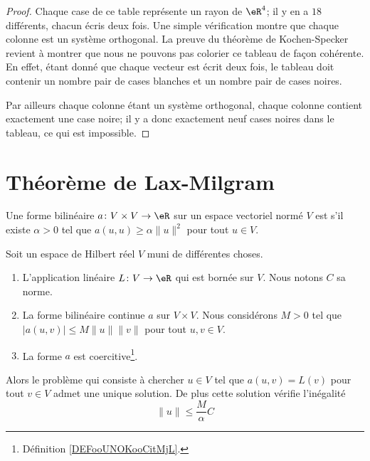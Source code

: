 \begin{proof}
    Chaque case de ce table représente un rayon de \( \eR^4\); il y en a \( 18\) différents, chacun écris deux fois. Une simple vérification montre que chaque colonne est un système orthogonal. La preuve du théorème de Kochen-Specker revient à montrer que nous ne pouvons pas colorier ce tableau de façon cohérente. En effet, étant donné que chaque vecteur est écrit deux fois, le tableau doit contenir un nombre pair de cases blanches et un nombre pair de cases noires.

    Par ailleurs chaque colonne étant un système orthogonal, chaque colonne contient exactement une case noire; il y a donc exactement neuf cases noires dans le tableau, ce qui est impossible.

\end{proof}

\section{Théorème de Lax-Milgram}

\begin{definition}      \label{DEFooUNOKooCitMjL}
    Une forme bilinéaire \( a\colon V\times V\to \eR\) sur un espace vectoriel normé \( V\) est  s'il existe \( \alpha>0\) tel que \(  a(u,u)\geq \alpha\| u \|^2 \) pour tout \( u\in V\).
\end{definition}

\begin{theorem}       \label{THOooLLUXooHyqmVL}
    Soit un espace de Hilbert réel \( V\) muni de différentes choses.
    \begin{enumerate}
        \item
            L'application linéaire \( L\colon V\to \eR\) qui est bornée sur \( V\). Nous notons \( C\) sa norme.
        \item
            La forme bilinéaire continue \( a\) sur \( V\times V\). Nous considérons \( M>0\) tel que \( | a(u,v) |\leq M\| u \|\| v \|\) pour tout \( u,v\in V\).
        \item
            La forme \( a\) est coercitive\footnote{Définition \ref{DEFooUNOKooCitMjL}.}.
    \end{enumerate}
    Alors le problème qui consiste à chercher \( u\in V\) tel que \( a(u,v)=L(v)\) pour tout \( v\in V\) admet une unique solution. De plus cette solution vérifie l'inégalité
    \begin{equation}        \label{EQooUAYSooKYyQBU}
        \| u \|\leq \frac{ M }{ \alpha }C
    \end{equation}
\end{theorem}

